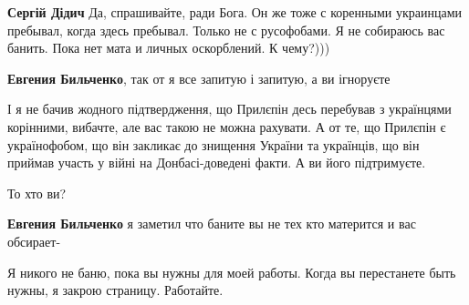 \begin{itemize}
\begin{itemize}
 
\textbf{Сергій Дідич} Да, спрашивайте, ради Бога. Он же тоже с коренными украинцами пребывал, когда здесь пребывал. Только не с русофобами. Я не собираюсь вас банить. Пока нет мата и личных оскорблений. К чему?)))

 
\textbf{Евгения Бильченко}, так от я все запитую і запитую, а ви ігноруєте

 

І я не бачив жодного підтвердження, що Прилєпін десь перебував з українцями
корінними, вибачте, але вас такою не можна рахувати. А от те, що Прилєпін є
українофобом, що він закликає до знищення України та українців, що він приймав
участь у війні на Донбасі-доведені факти. А ви його підтримуєте.

То хто ви?


 
\textbf{Евгения Бильченко} я заметил что баните вы не тех кто матерится и вас обсирает-

 
Я никого не баню, пока вы нужны для моей работы. Когда вы перестанете быть нужны, я закрою страницу. Работайте.


\end{itemize}
\end{itemize}
